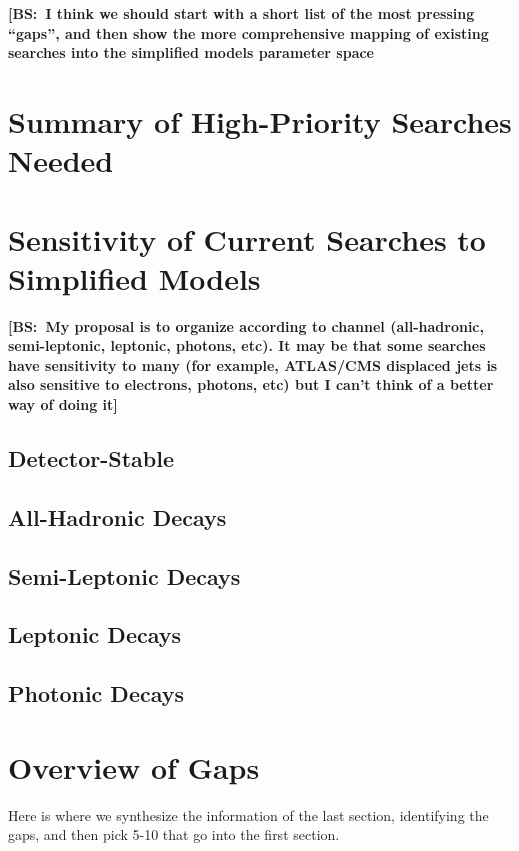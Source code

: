 {\bf [BS:~I think we should start with a short list of the most pressing ``gaps'', and then show the more comprehensive mapping of existing searches into the simplified models parameter space}

\section{Summary of High-Priority Searches Needed}

\section{Sensitivity of Current Searches to Simplified Models}

{\bf [BS:~My proposal is to organize according to channel (all-hadronic, semi-leptonic, leptonic, photons, etc). It may be that some searches have sensitivity to many (for example, ATLAS/CMS displaced jets is also sensitive to electrons, photons, etc) but I can't think of a better way of doing it]}

\subsection{Detector-Stable}
\subsection{All-Hadronic Decays}
\subsection{Semi-Leptonic Decays}
\subsection{Leptonic Decays}
\subsection{Photonic Decays}

\section{Overview of Gaps}

Here is where we synthesize the information of the last section, identifying the gaps, and then pick 5-10 that go into the first section.